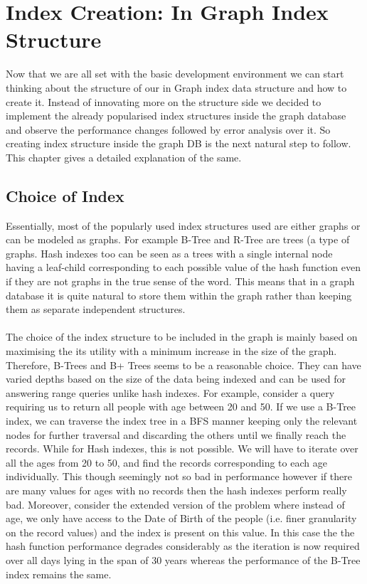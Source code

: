 
\chapter{Index Creation: In Graph Index Structure} %

\label{Chapter 3} %

Now that we are all set with the basic development environment we can start thinking about the structure of our in Graph index data structure and how to create it. Instead of innovating more on the structure side we decided to implement the already popularised index structures inside the graph database and observe the performance changes followed by error analysis over it. So creating index structure inside the graph DB is the next natural step to follow. This chapter gives a detailed explanation of the same.


\section{Choice of Index}
Essentially, most of the popularly used index structures used are either graphs or can be modeled as graphs. For example B-Tree and R-Tree are trees (a type of graphs. Hash indexes too can be seen as a trees with a single internal node having a leaf-child corresponding to each possible value of the hash function even if they are not graphs in the true sense of the word. This means that in a graph database it is quite natural to store them within the graph rather than keeping them as separate independent structures.\\\\
The choice of the index structure to be included in the graph is mainly based on maximising the its utility with a minimum increase in the size of the graph. Therefore, B-Trees and B+ Trees seems to be a reasonable choice. They can have varied depths based on the size of the data being indexed and can be used for answering range queries unlike hash indexes. For example, consider a query requiring us to return all people with age between 20 and 50. If we use a B-Tree index, we can traverse the index tree in a BFS manner keeping only the relevant nodes for further traversal and discarding the others until we finally reach the records. While for Hash indexes, this is not possible. We will have to iterate over all the ages from 20 to 50, and find the records corresponding to each age individually. This though seemingly not so bad in performance however if there are many values for ages with no records then the hash indexes perform really bad. Moreover, consider the extended version of the problem where instead  of age, we only have access to the Date of Birth of the people (i.e. finer granularity on the record values) and the index is present on this value. In this case the the hash function performance degrades considerably as the iteration is now required over all days lying in the span of 30 years whereas the performance of the B-Tree index remains the same.


